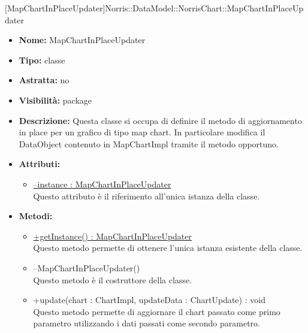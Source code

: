 			
			[MapChartInPlaceUpdater]{Norris::DataModel::NorrisChart::MapChartInPlaceUpdater}
			

	
			
			\begin{itemize}
			\item \textbf{Nome:} MapChartInPlaceUpdater
			\item \textbf{Tipo:} classe
			
		\item \textbf{Astratta:}
		no
			\item \textbf{Visibilità:} package
			\item \textbf{Descrizione:} Questa classe si occupa di definire il metodo di aggiornamento in place per un grafico di tipo map chart. In particolare modifica il DataObject contenuto in MapChartImpl tramite il metodo opportuno.
			\item \textbf{Attributi:}
				\begin{itemize}
				\setlength{\itemsep}{5pt}
				
					\item[\ding{111}] \underline{--instance : MapChartInPlaceUpdater} \\ [1mm] Questo attributo è il riferimento all'unica istanza della classe.
				\end{itemize}
		
			\item \textbf{Metodi:}
				\begin{itemize}
				\setlength{\itemsep}{5pt}
				
					\item[\ding{111}] {\underline{+getInstance() : MapChartInPlaceUpdater}} \\ [1mm] Questo metodo permette di ottenere l'unica istanza esistente della classe.
					\item[\ding{111}] {{--MapChartInPlaceUpdater()}} \\ [1mm] Questo metodo è il costruttore della classe.
					\item[\ding{111}] {{+update(chart : ChartImpl, updateData : ChartUpdate) : void}} \\ [1mm] Questo metodo permette di aggiornare il chart passato come primo parametro utilizzando i dati passati come secondo parametro.
				\end{itemize}
		
			\end{itemize}

